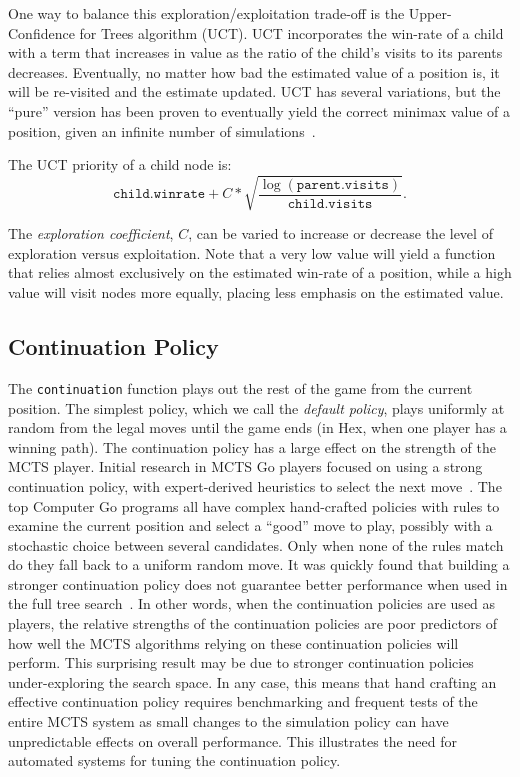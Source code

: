 \documentclass{acm_proc_article-sp}
\begin{document}
One way to balance this exploration/exploitation trade-off is the Upper-Confidence for Trees algorithm (UCT). 
UCT incorporates the win-rate of a child with a term that increases in value as the ratio of the child's visits to its parents decreases. 
Eventually, no matter how bad the estimated value of a position is, it will be re-visited and the estimate updated. 
UCT has several variations, but the ``pure'' version has been proven to eventually yield the correct minimax value of a position, given an infinite number of simulations~\cite{gelly2006exploration}.

The UCT priority of a child node is:
\[
	\texttt{child.winrate} + C*\sqrt{\frac{\log{(\texttt{parent.visits})}}{\texttt{child.visits}}}.
\]

The \emph{exploration coefficient}, $C$, can be varied to increase or decrease the level of exploration versus exploitation. Note that a very low value will yield a function that relies almost exclusively on the estimated win-rate of a position, while a high value will visit nodes more equally, placing less emphasis on the estimated value.

\subsection{Continuation Policy}

The \texttt{continuation} function plays out the rest of the game from the current position. 
The simplest policy, which we call the \emph{default policy},
 plays uniformly at random from the legal moves until the game ends (in Hex, when one player has a winning path). 
The continuation policy has a large effect on the strength of the MCTS player.
Initial research in MCTS Go players focused on using a strong continuation policy, with expert-derived heuristics to select the next move~\cite{chaslot2010adding}. 
The top Computer Go programs all have complex hand-crafted policies with rules to examine the current position and select a ``good'' move to play, possibly with a stochastic choice between several candidates. 
Only when none of the rules match do they fall back to a uniform random move. 
It was quickly found that building a stronger continuation policy does not guarantee better performance when used in the full tree search~\cite{gelly2006modification}. 
In other words, when the continuation policies are used as players, the relative strengths of the continuation policies are poor predictors
of how well the MCTS algorithms relying on these continuation policies will perform.
This surprising result may be due to stronger continuation policies under-exploring the search space.
In any case, this means that hand crafting an effective continuation policy requires benchmarking and frequent tests of the entire
MCTS system as small changes to the simulation policy can have unpredictable effects on overall performance.
This illustrates the need for automated systems for tuning the continuation policy.
\end{document}
